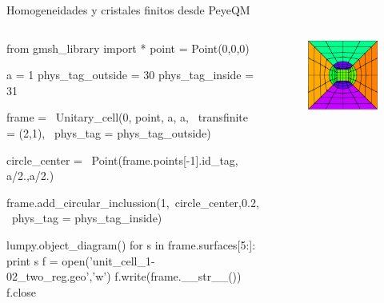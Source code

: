 \documentclass[xcolor=table,serif,handout]{beamer}
\begin{document}
	\begin{frame}[fragile]{Homogeneidades y cristales finitos desde PeyeQM}
	\begin{columns}
		\tiny
			\begin{python}
	from gmsh_library import *
	point = Point(0,0,0)

a = 1
phys_tag_outside = 30
phys_tag_inside = 31

frame = \
Unitary_cell(0, point, a, a, \
transfinite = (2,1), \
phys_tag = phys_tag_outside)

circle_center = \
Point(frame.points[-1].id_tag, a/2.,a/2.)

frame.add_circular_inclussion(1,\
circle_center,0.2, \
phys_tag = phys_tag_inside)

lumpy.object_diagram()
for s in frame.surfaces[5:]:
    print s
f = open('unit_cell_1-02_two_reg.geo','w')
f.write(frame.__str__())
f.close
			\end{python}
			\begin{figure}
			\centering
			\includegraphics[scale=0.2]{unit_cell_pretty.eps}
			\end{figure}
		\end{columns}
	\end{frame}
\end{document}
